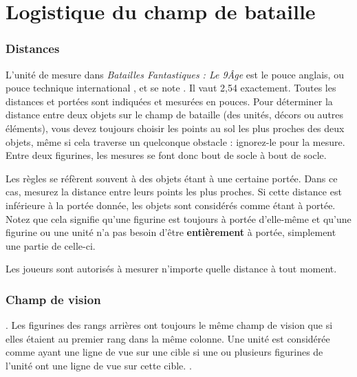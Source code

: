 
\part{Logistique du champ de bataille}

\section{Distances}

L'unité de mesure dans \emph{Batailles Fantastiques : Le 9\ieme Âge} est le pouce anglais, ou \og pouce technique international \fg , et se note \pouce. Il vaut 2,54 {\centi\meter} exactement. Toutes les distances et portées sont indiquées et mesurées en pouces. Pour déterminer la distance entre deux objets sur le champ de bataille (des unités, décors ou autres éléments), vous devez toujours choisir les points au sol les plus proches des deux objets, même si cela traverse un quelconque obstacle : ignorez-le pour la mesure. Entre deux figurines, les mesures se font donc bout de socle à bout de socle.

Les règles se réfèrent souvent à des objets étant à une certaine portée. Dans ce cas, mesurez la distance entre leurs points les plus proches. Si cette distance est inférieure à la portée donnée, les objets sont considérés comme étant à portée. Notez que cela signifie qu'une figurine est toujours à portée d'elle-même et qu'une figurine ou une unité n'a pas besoin d'être \textbf{entièrement} à portée, simplement une partie de celle-ci.
 
Les joueurs sont autorisés à mesurer n'importe quelle distance à tout moment.

\section{Champ de vision}

. Les figurines des rangs arrières ont toujours le même champ de vision que si elles étaient au premier rang dans la même colonne. Une unité est considérée comme ayant une ligne de vue sur une cible si une ou plusieurs figurines de l'unité ont une ligne de vue sur cette cible. .

